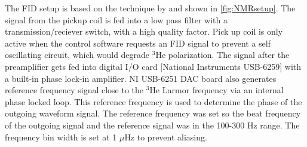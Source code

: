 The FID setup is based on the technique by \cite{Parnell2008} and shown in \cref{fig:NMRsetup}. The signal from the pickup coil is fed into a low pass filter with a transmission/reciever switch, with a high quality factor. Pick up coil is only active when the control software requests an FID signal to prevent a self oscillating circuit, which would degrade $^3$He polarization. The signal after the preamplifier gets fed into digital I/O card [National Instruments USB-6259] with a built-in phase lock-in amplifier. NI USB-6251 DAC board also generates reference frequency signal close to the $^3$He Larmor frequency via an internal phase locked loop. This reference frequency is used to determine the phase of the outgoing waveform signal. The reference frequency was set so the beat frequency of the outgoing signal and the reference signal was in the 100-300 Hz range. The frequency bin width is set at 1 $\mu$Hz to prevent aliasing. 


